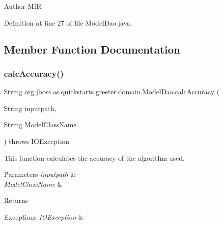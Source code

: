 \begin{DoxyAuthor}{Author}
M\+IR 
\end{DoxyAuthor}


Definition at line 27 of file Model\+Dao.\+java.



\subsection{Member Function Documentation}
\mbox{\label{interfaceorg_1_1jboss_1_1as_1_1quickstarts_1_1greeter_1_1domain_1_1_model_dao_afb454f408ff6b9892a5d6e59cddca2c0}} 
\subsubsection{\texorpdfstring{calc\+Accuracy()}{calcAccuracy()}}
{\footnotesize\ttfamily String org.\+jboss.\+as.\+quickstarts.\+greeter.\+domain.\+Model\+Dao.\+calc\+Accuracy (\begin{DoxyParamCaption}\item[{String}]{inputpath,  }\item[{String}]{Model\+Class\+Name }\end{DoxyParamCaption}) throws I\+O\+Exception}



This function calculates the accuracy of the algorithm used. 


\begin{DoxyParams}{Parameters}
{\em inputpath} & \\
\hline
{\em Model\+Class\+Name} & \\
\hline
\end{DoxyParams}
\begin{DoxyReturn}{Returns}

\end{DoxyReturn}

\begin{DoxyExceptions}{Exceptions}
{\em I\+O\+Exception} & \\
\hline
\end{DoxyExceptions}


